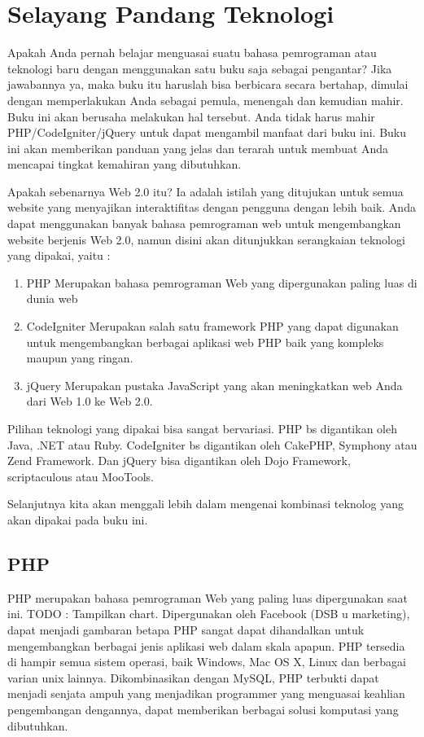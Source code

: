 \section{Selayang Pandang Teknologi}
Apakah Anda pernah belajar menguasai suatu bahasa pemrograman atau teknologi baru dengan menggunakan satu buku saja sebagai pengantar? Jika jawabannya ya, maka buku itu haruslah bisa berbicara secara bertahap, dimulai dengan memperlakukan Anda sebagai pemula, menengah dan kemudian mahir. Buku ini akan berusaha melakukan hal tersebut. Anda tidak harus mahir PHP/CodeIgniter/jQuery untuk dapat mengambil manfaat dari buku ini. Buku ini akan memberikan panduan yang jelas dan terarah untuk membuat Anda mencapai tingkat kemahiran yang dibutuhkan.

Apakah sebenarnya Web 2.0 itu? Ia adalah istilah yang ditujukan untuk semua website yang menyajikan interaktifitas dengan pengguna dengan lebih baik. Anda dapat menggunakan banyak bahasa pemrograman web untuk mengembangkan website berjenis Web 2.0, namun disini akan ditunjukkan serangkaian teknologi yang dipakai, yaitu :
\begin{enumerate}
\item PHP
  Merupakan bahasa pemrograman Web yang dipergunakan paling luas di dunia web
\item CodeIgniter
  Merupakan salah satu framework PHP yang dapat digunakan untuk mengembangkan berbagai aplikasi web PHP baik yang kompleks maupun yang ringan.
\item jQuery
  Merupakan pustaka JavaScript yang akan meningkatkan web Anda dari Web 1.0 ke Web 2.0.
\end{enumerate}

Pilihan teknologi yang dipakai bisa sangat bervariasi. PHP bs digantikan oleh Java, .NET atau Ruby. CodeIgniter bs digantikan oleh CakePHP, Symphony atau Zend Framework. Dan jQuery bisa digantikan oleh Dojo Framework, scriptaculous atau MooTools. 

Selanjutnya kita akan menggali lebih dalam mengenai kombinasi teknolog yang akan dipakai pada buku ini.
\subsection{PHP}
PHP merupakan bahasa pemrograman Web yang paling luas dipergunakan saat ini. TODO : Tampilkan chart. Dipergunakan oleh Facebook (DSB u marketing), dapat menjadi gambaran betapa PHP sangat dapat dihandalkan untuk mengembangkan berbagai jenis aplikasi web dalam skala apapun. PHP tersedia di hampir semua sistem operasi, baik Windows, Mac OS X, Linux dan berbagai varian unix lainnya. Dikombinasikan dengan MySQL, PHP terbukti dapat menjadi senjata ampuh yang menjadikan programmer yang menguasai keahlian pengembangan dengannya, dapat memberikan berbagai solusi komputasi yang dibutuhkan.
